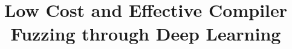 



\title{Low Cost and Effective Compiler Fuzzing through Deep Learning}

\maketitle


\lstset{language=[OpenCL]C}












